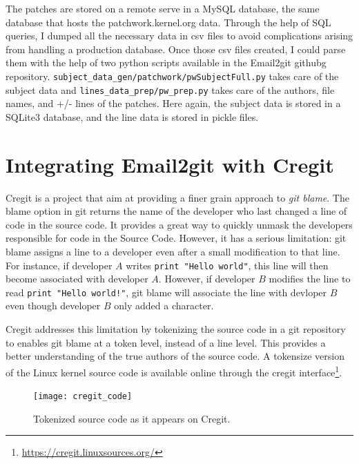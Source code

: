 The patches are stored on a remote serve in a MySQL database, the same database that hosts the patchwork.kernel.org data. Through the help of SQL queries, I dumped all the necessary data in csv files to avoid complications arising from handling a production database. Once those csv files created, I could parse them with the help of two python scripts available in the Email2git githubg repository. \texttt{subject\_data\_gen/patchwork/pwSubjectFull.py} takes care of the subject data and \texttt{lines\_data\_prep/pw\_prep.py} takes care of the authors, file names, and +/- lines of the patches. Here again, the subject data is stored in a SQLite3 database, and the line data is stored in pickle files. 









\section{Integrating Email2git with Cregit}

Cregit is a project that aim at providing a finer grain approach to \textit{git blame}. The blame option in git returns the name of the developer who last changed a line of code in the source code. It provides a great way to quickly unmask the developers responsible for code in the Source Code. However, it has a serious limitation: git blame assigns a line to a developer even after a small modification to that line. For instance, if developer $A$ writes \texttt{print "Hello world"}, this line will then become associated with developer $A$. However, if developer $B$ modifies the line to read \texttt{print "Hello world!"}, git blame will associate the line with devloper $B$ even though developer $B$ only added a character. 

Cregit addresses this limitation by tokenizing the source code in a git repository to enables git blame at a token level, instead of a line level. This provides a better understanding of the true authors of the source code. A tokensize version of the Linux kernel source code is available online through the cregit interface\footnote{\url{https://cregit.linuxsources.org/}}.

\begin{figure}[htb]
\centering
\texttt{[image: cregit\_code]}
\caption{Tokenized source code as it appears on Cregit.}
\label{fig:cregit_code}
\end{figure}

